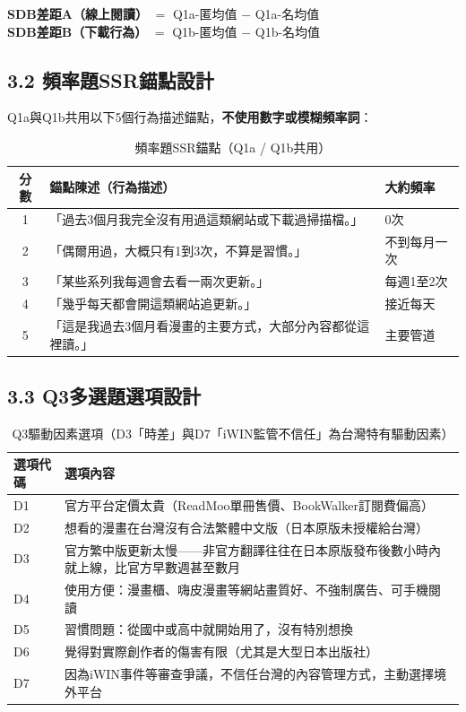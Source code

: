 \documentclass[12pt, a4paper]{article}
\begin{document}
\noindent
\textbf{SDB差距A（線上閱讀）} $=$ Q1a-匿均值 $-$ Q1a-名均值\\
\textbf{SDB差距B（下載行為）} $=$ Q1b-匿均值 $-$ Q1b-名均值

\subsection{3.2 頻率題SSR錨點設計}

Q1a與Q1b共用以下5個行為描述錨點，\textbf{不使用數字或模糊頻率詞}：

\begin{table}[H]
\centering\small
\begin{tabular}{cp{10.5cm}p{2cm}}
\toprule
\textbf{分數} & \textbf{錨點陳述（行為描述）} & \textbf{大約頻率} \\
\midrule
1 & 「過去3個月我完全沒有用過這類網站或下載過掃描檔。」 & 0次 \\
2 & 「偶爾用過，大概只有1到3次，不算是習慣。」 & 不到每月一次 \\
3 & 「某些系列我每週會去看一兩次更新。」 & 每週1至2次 \\
4 & 「幾乎每天都會開這類網站追更新。」 & 接近每天 \\
5 & 「這是我過去3個月看漫畫的主要方式，大部分內容都從這裡讀。」 & 主要管道 \\
\bottomrule
\end{tabular}
\caption{頻率題SSR錨點（Q1a / Q1b共用）}
\end{table}

\subsection{3.3 Q3多選題選項設計}

\begin{table}[H]
\centering\small
\begin{tabular}{lp{11cm}}
\toprule
\textbf{選項代碼} & \textbf{選項內容} \\
\midrule
D1 & 官方平台定價太貴（ReadMoo單冊售價、BookWalker訂閱費偏高） \\
D2 & 想看的漫畫在台灣沒有合法繁體中文版（日本原版未授權給台灣） \\
D3 & 官方繁中版更新太慢——非官方翻譯往往在日本原版發布後數小時內就上線，比官方早數週甚至數月 \\
D4 & 使用方便：漫畫櫃、嗨皮漫畫等網站畫質好、不強制廣告、可手機閱讀 \\
D5 & 習慣問題：從國中或高中就開始用了，沒有特別想換 \\
D6 & 覺得對實際創作者的傷害有限（尤其是大型日本出版社） \\
D7 & 因為iWIN事件等審查爭議，不信任台灣的內容管理方式，主動選擇境外平台 \\
\bottomrule
\end{tabular}
\caption{Q3驅動因素選項（D3「時差」與D7「iWIN監管不信任」為台灣特有驅動因素）}
\end{table}
\end{document}
